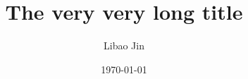 \documentclass{beamer}
\title[Short title]{The very very long title}
\author[L. Jin]{Libao Jin}
\institute[UWyo]{University of Wyoming}
\date{\today}
\begin{document}
\begin{frame}
\maketitle
\end{frame}


\end{document}
